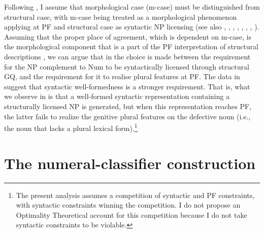 \documentclass[output=paper,
modfonts,
newtxmath,
hidelinks
]{langscibook}
\begin{document}
Following \citet{Bobaljik2008}, I assume that morphological case (m-case) must be distinguished from structural case, with m-case being treated as a morphological phenomenon applying at PF and structural case as syntactic NP licensing (see also \citealt{Harley1995}, \citealt{Marantz2000}, \citealt{McFadden2004}, \citealt{Schütze1997}, \citealt{Sigurðsson1991},  \citealt{Sigurðsson2003}, \citealt{Yip-etal1987}, \citealt{Zaenen-etal1985}). Assuming that the proper place of agreement, which is dependent on m-case, is the morphological component that is a part of the PF interpretation of structural descriptions \citep{Bobaljik2008}, we can argue that in  the choice is made between the requirement for the NP complement to Num to be syntactically licensed through structural GQ, and the requirement for it to realise plural features at PF. The data in  suggest that syntactic well-formedness is a stronger requirement. That is, what we observe in  is that a well-formed syntactic representation containing a structurally licensed NP is generated, but when this representation reaches PF, the latter fails to realize the genitive plural features on the defective noun (i.e., the noun that lacks a plural lexical form).\footnote{\label{fn6}The present analysis assumes a competition of syntactic and PF constraints, with syntactic constraints winning the competition. I do not propose an Optimality Theoretical account for this competition because I do not take syntactic constraints to be violable.}

\section{The numeral-classifier construction}\label{s2}
\end{document}
